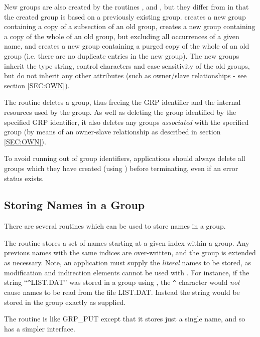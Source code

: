 New groups are also created by the routines ,  and
, but they differ from  in that the created group is based on
a previously existing group.  creates a new group containing a copy of
a subsection of an old group,  creates a new group containing a copy
of the whole of an old group, but excluding all occurrences of a given name, and
 creates a new group containing a purged copy of the whole of an old
group (i.e. there are no duplicate entries in the new group). The new groups
inherit the type string, control characters and case sensitivity of the old
groups, but do not inherit any other attributes (such as owner/slave
relationships - see section \ref {SEC:OWN}).

The routine  deletes a group, thus freeing the GRP identifier and the
internal resources used by the group. As well as deleting the group identified
by the specified GRP identifier, it also deletes any groups {\em associated}
with the specified group (by means of an owner-slave relationship as described
in section \ref{SEC:OWN}).

To avoid running out of group identifiers, applications should always delete all
groups which they have created (using ) before terminating, even if an
error status exists.

\subsection{\label{SEC:ADDN}Storing Names in a Group}
There are several routines which can be used to store names in a group.

The routine  stores a set of names starting at a given index within a
group. Any previous names with the same indices are over-written, and the group
is extended as necessary. Note, an application must supply the {\em literal}
names to be stored, as modification and indirection elements cannot be used with
. For instance, if the string ``\verb+^+LIST.DAT'' was stored in a group
using , the \verb+^+ character would {\em not} cause names to be read
from the file LIST.DAT. Instead the string would be stored in the group exactly
as supplied.

The routine  is like GRP\_PUT except that it
stores just a single name, and so has a simpler interface.

